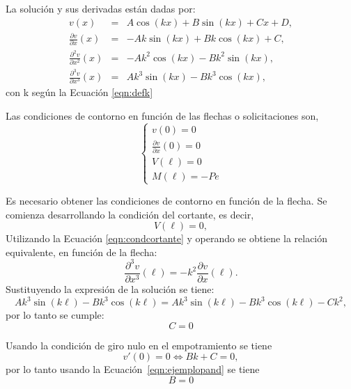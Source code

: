 La solución y sus derivadas están dadas por:
\begin{eqnarray}
v(x) &=& A \cos(k x ) + B \sin(kx) + C x + D, \\
\frac{\partial   v}{\partial x  } (x) &=& -A k \sin(k x ) + B k \cos(kx) + C , \\
\frac{\partial^2 v}{\partial x^2} (x) &=& - A k^2 \cos(k x ) - B k^2 \sin(kx),  \\
\frac{\partial^3 v}{\partial x^3} (x) &=& A k^3 \sin(k x ) - B k^3 \cos(kx), 
\end{eqnarray}
con k según la Ecuación \eqref{eqn:defk}

Las condiciones de contorno en función de las flechas o solicitaciones son,
\begin{equation}
\left\{
\begin{array}{l}
v(0)=0 \\[.5em]
\displaystyle \frac{\partial v}{\partial x}(0)=0\\[1em]
V(\ell)=0\\[.5em]
M(\ell)=-P e
\end{array}
\right.
\end{equation}

Es necesario obtener las condiciones de contorno en función de la flecha. %
Se comienza desarrollando la condición del cortante, es decir,
%
\begin{equation}
	V(\ell) = 0,
\end{equation}
Utilizando la Ecuación \eqref{eqn:condcortante} y operando se obtiene la relación equivalente, en función de la flecha:
%
\begin{equation}
  \frac{\partial^3 v}{\partial x^3} (\ell) = - k^2 \frac{\partial v}{\partial x}(\ell).
\end{equation}
%
Sustituyendo la expresión de la solución se tiene:
%	
\begin{equation}
	Ak^3 \sin(k\ell) - Bk^3 \cos(k\ell) = Ak^3 \sin(k\ell) - Bk^3 \cos(k\ell) - C k^2,
\end{equation}
por lo tanto se cumple:
\begin{equation}\label{eqn:ejemplopand}
\boxed{
  C=0
}
\end{equation}

Usando la condición de giro nulo en el empotramiento se tiene
\begin{equation}
v'(0)=0 \Leftrightarrow  Bk + C = 0,
\end{equation}
%
por lo tanto usando la Ecuación~\eqref{eqn:ejemplopand} se tiene
\begin{equation}
\boxed{
B=0
}
\end{equation}

